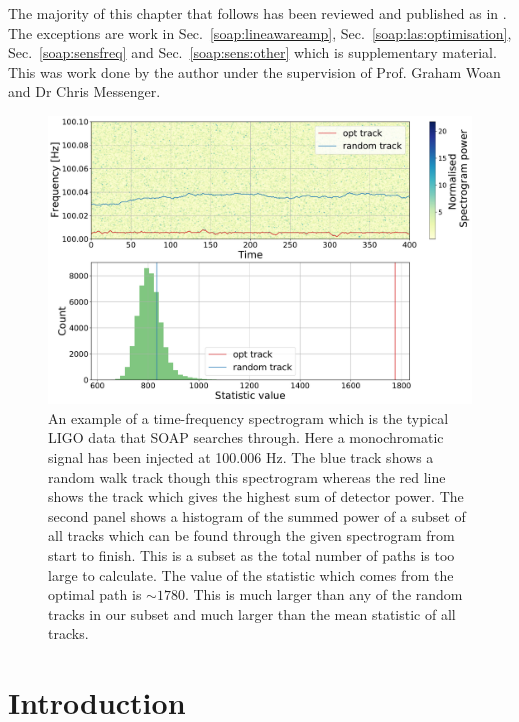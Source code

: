 The majority of this chapter that follows has been reviewed and published as in
\citep{bayley2019GeneralizedApplication}.  The
exceptions are work in Sec.~\ref{soap:lineawareamp},
Sec.~\ref{soap:las:optimisation}, Sec.~\ref{soap:sensfreq} and
Sec.~\ref{soap:sens:other} which is supplementary material.
This was work done by the author
under the supervision of Prof. Graham Woan and Dr Chris Messenger.


\begin{figure}[ht]

\centering
\includegraphics[width=\linewidth]{C3_soap/soap_spect_motivation.pdf}
\caption[Example of frequency tracks through a spectrogram and their summed power.]{An example of a time-frequency spectrogram which is the typical \gls{LIGO} data that SOAP searches through. Here a monochromatic signal has been injected at 100.006 Hz. The blue track shows a random walk track though this spectrogram whereas the red line shows the track which gives the highest sum of detector power. The second panel shows a histogram of the summed power of a subset of all tracks which can be found through the given spectrogram from start to finish. This is a subset as the total number of paths is too large to calculate. The value of the statistic which comes from the optimal path is $\sim1780$. This is much larger than any of the random tracks in our subset and much larger than the mean statistic of all tracks. }
\label{soap:motivation:plot}

\end{figure}

\section{Introduction}

